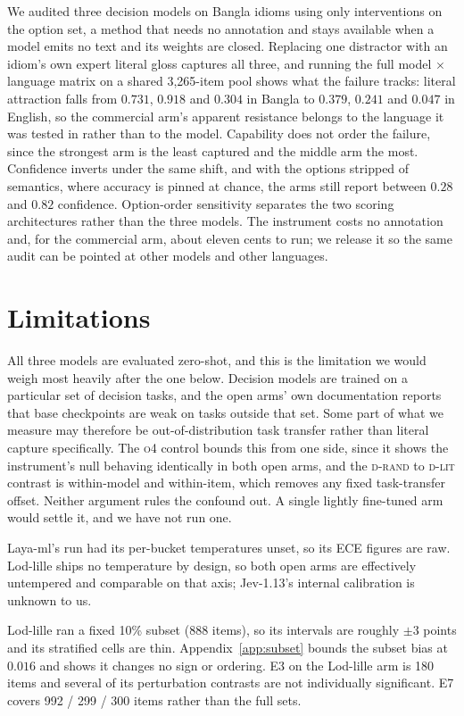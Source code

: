 \documentclass[11pt]{article}
\newcommand{\Drand}{\textsc{d-rand}}
\newcommand{\Dlit}{\textsc{d-lit}}
\begin{document}
We audited three decision models on Bangla idioms using only interventions on
the option set, a method that needs no annotation and stays available when a
model emits no text and its weights are closed. Replacing one distractor with an
idiom's own expert literal gloss captures all three, and running the full model
$\times$ language matrix on a shared 3{,}265-item pool shows what the failure
tracks: literal attraction falls from $0.731$, $0.918$ and $0.304$ in Bangla to
$0.379$, $0.241$ and $0.047$ in English, so the commercial arm's apparent
resistance belongs to the language it was tested in rather than to the model.
Capability does not order the failure, since the strongest arm is the least
captured and the middle arm the most. Confidence inverts under the same shift,
and with the options stripped of semantics, where accuracy is pinned at chance,
the arms still report between $0.28$ and $0.82$ confidence. Option-order
sensitivity separates the two scoring architectures rather than the three
models. The instrument costs no annotation and, for the commercial arm, about
eleven cents to run; we release it so the same audit can be pointed at other
models and other languages.

\section*{Limitations}

All three models are evaluated zero-shot, and this is the limitation we would
weigh most heavily after the one below. Decision models are trained on a
particular set of decision tasks, and the open arms' own documentation reports
that base checkpoints are weak on tasks outside that set. Some part of what we
measure may therefore be out-of-distribution task transfer rather than literal
capture specifically. The \textsc{o4} control bounds this from one side, since
it shows the instrument's null behaving identically in both open arms, and the
\Drand{} to \Dlit{} contrast is within-model and within-item, which removes any
fixed task-transfer offset. Neither argument rules the confound out. A single
lightly fine-tuned arm would settle it, and we have not run one.

Laya-ml's run had its per-bucket temperatures unset, so its ECE figures are raw.
Lod-lille ships no temperature by design, so both open arms are effectively
untempered and comparable on that axis; Jev-1.13's internal calibration is
unknown to us.

Lod-lille ran a fixed 10\% subset (888 items), so its intervals are roughly
$\pm 3$ points and its stratified cells are thin. Appendix~\ref{app:subset}
bounds the subset bias at $0.016$ and shows it changes no sign or ordering. E3
on the Lod-lille arm is 180 items and several of its perturbation contrasts are
not individually significant. E7 covers 992 / 299 / 300 items rather than the
full sets.
\end{document}
